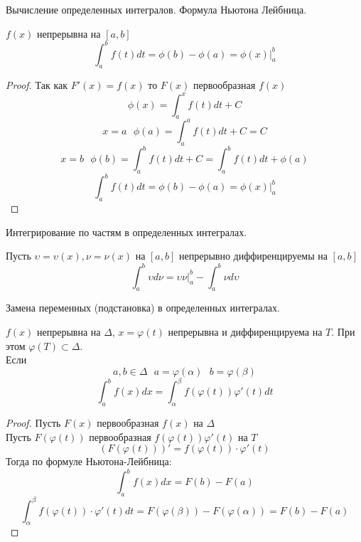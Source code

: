 \begin{title}[\Large]
  Вычисление определенных интегралов. Формула Ньютона Лейбница.
\end{title}

\begin{theorem}
  $f(x)$ непрерывна на $[a, b]$
  \[\int^b_a f(t)dt = \phi(b) - \phi(a) = \phi(x)|^b_a\]
\end{theorem}

\begin{proof}
  Так как $F'(x) = f(x)$ то $F(x)$ первообразная $f(x)$
  \[\phi (x) = \int^x_a f(t)dt + C\]
  \[x = a ~~~ \phi (a) = \int^a_a f(t)dt + C = C\]
  \[x = b ~~~ \phi (b) = \int^b_a f(t)dt + C = \int^b_a f(t)dt + \phi(a)\]
  \[\int^b_a f(t)dt = \phi(b) - \phi(a) = \phi(x)|^b_a\]
\end{proof}

\begin{title}[\Large]
  Интегрирование по частям в определенных интегралах.
\end{title}

\begin{theorem}
  Пусть $\upsilon = \upsilon (x), \nu = \nu(x)$ на $[a,b]$ непрерывно
  диффиренцируемы на $[a,b]$
  \[
    \int_a^b \upsilon d\nu = \upsilon \nu |_a^b - \int_a^b \nu d\upsilon
  \]
\end{theorem}

\begin{title}[\Large]
  Замена переменных (подстановка) в определенных интегралах.
\end{title}

\begin{theorem}
  $f(x)$ непрерывна на $\Delta$, $x = \varphi (t)$ непрерывна и
  диффиренцируема на $T$. При этом $\varphi (T) \subset \Delta$.\\
  Если
  \[a, b \in \Delta ~~~ a = \varphi (\alpha) ~~~ b = \varphi (\beta)\]
  \[\int^b_a f(x)dx = \int^{\beta}_{\alpha} f(\varphi (t)) \varphi' (t)dt\]
\end{theorem}

\begin{proof}
  Пусть $F(x)$ первообразная $f(x)$ на $\Delta$\\
  Пусть $F(\varphi(t))$ первообразная $f(\varphi(t))\varphi'(t)$ на $T$\\
  \[
    (F(\varphi (t)))' = f(\varphi(t)) \cdot \varphi'(t)
  \]
  Тогда по формуле Ньютона-Лейбница:
  \[\int^b_a f(x)dx = F(b) - F(a)\]
  \[
    \int^{\beta}_{\alpha} f(\varphi (t)) \cdot \varphi' (t)dt =
    F(\varphi (\beta)) - F(\varphi (\alpha)) = F(b) - F(a)
  \]
\end{proof}

